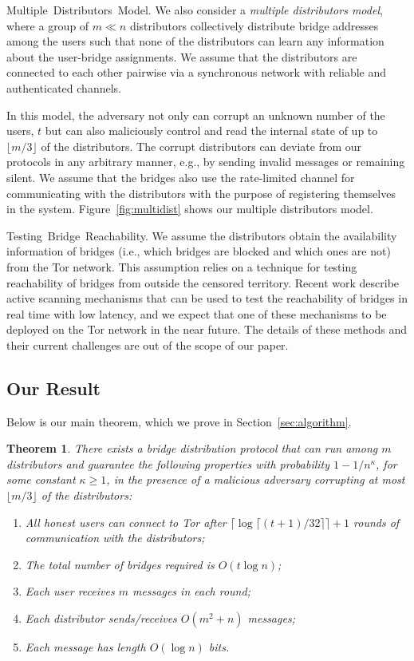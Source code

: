 \documentclass{sig-alternate-05-2015}
\newcommand{\eg}{e.g.}
\newtheorem{theorem}{Theorem}
\newcommand{\sfsize}{\fontsize{0.8\baselineskip}{0.68\baselineskip}\selectfont}
\newcommand{\sans}[1]{\textsf{\sfsize \mbox{#1}}}
\newcommand{\para}[1]{\vspace{0.55em} \noindent \sans{{\mbox{#1}}}}
\begin{document}
\para{Multiple Distributors Model.} 
We also consider a \emph{multiple distributors model}, where a group of \mbox{$m \ll n$} distributors collectively distribute bridge addresses among the users such that none of the distributors can learn any information about the user-bridge assignments. We assume that the distributors are connected to each other pairwise via a synchronous network with reliable and authenticated channels.

In this model, the adversary not only can corrupt an unknown number of the users, $t$ but can also maliciously control and read the internal state of up to $\lfloor m/3 \rfloor$ of the distributors. The corrupt distributors can deviate from our protocols in any arbitrary manner, \eg, by sending invalid messages or remaining silent. 
We assume that the bridges also use the rate-limited channel for communicating with the distributors with the purpose of registering themselves in the system. Figure~\ref{fig:multidist} shows our multiple distributors model.

\para{Testing Bridge Reachability.} We assume the distributors obtain the availability information of bridges (i.e., which bridges are blocked and which ones are not) from the Tor network. This assumption relies on a technique for testing reachability of bridges from outside the censored territory. Recent work \cite{Dingledine:BridgeReach:2011,Ensafi:2014:PAM} describe active scanning mechanisms that can be used to test the reachability of bridges in real time with low latency, and we expect that one of these mechanisms to be deployed on the Tor network in the near future. The details of these methods and their current challenges are out of the scope of our paper.

\subsection{Our Result} \label{sec:results}
\noindent Below is our main theorem, which we prove in Section~\ref{sec:algorithm}.
\begin{theorem}
	\label{thm:main} There exists a bridge distribution protocol that can run among $m$ distributors and guarantee the following properties with probability ${1 - 1/n^\kappa}$, for some constant ${\kappa \geq 1}$, in the presence of a malicious adversary corrupting at most $\lfloor m/3 \rfloor$ of the distributors: %
	\begin{enumerate}[itemsep=0.4em,topsep=0.5em]
		\item All honest users can connect to Tor after ${\lceil \log{\lceil (t+1)/32 \rceil} \rceil + 1}$ rounds of communication with the distributors;
		\item The total number of bridges required is $O(t\log{n})$;
		\item Each user receives $m$ messages in each round;
		\item Each distributor sends/receives $O(m^2 + n)$ messages;
		\item Each message has length $O(\log{n})$ bits.
	\end{enumerate}
\end{theorem}
\end{document}
